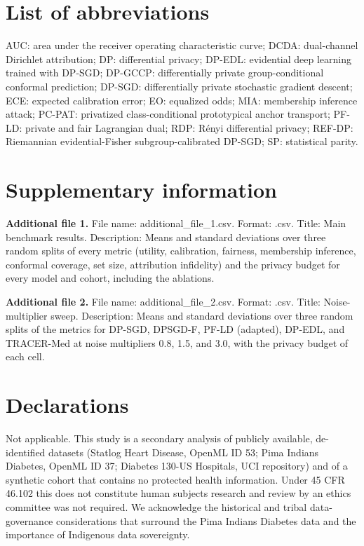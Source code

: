 \documentclass[pdflatex,sn-vancouver-num,referee,lineno]{sn-jnl}
\theoremstyle{thmstyleone}
\theoremstyle{thmstylethree}
\begin{document}
\section*{List of abbreviations}
\noindent AUC: area under the receiver operating characteristic curve; DCDA: dual-channel Dirichlet attribution; DP: differential privacy; DP-EDL: evidential deep learning trained with DP-SGD; DP-GCCP: differentially private group-conditional conformal prediction; DP-SGD: differentially private stochastic gradient descent; ECE: expected calibration error; EO: equalized odds; MIA: membership inference attack; PC-PAT: privatized class-conditional prototypical anchor transport; PF-LD: private and fair Lagrangian dual; RDP: R\'enyi differential privacy; REF-DP: Riemannian evidential-Fisher subgroup-calibrated DP-SGD; SP: statistical parity.


\section*{Supplementary information}
\noindent\textbf{Additional file 1.} File name: additional\_file\_1.csv. Format: .csv. Title: Main benchmark results. Description: Means and standard deviations over three random splits of every metric (utility, calibration, fairness, membership inference, conformal coverage, set size, attribution infidelity) and the privacy budget for every model and cohort, including the ablations.

\noindent\textbf{Additional file 2.} File name: additional\_file\_2.csv. Format: .csv. Title: Noise-multiplier sweep. Description: Means and standard deviations over three random splits of the metrics for DP-SGD, DPSGD-F, PF-LD (adapted), DP-EDL, and TRACER-Med at noise multipliers 0.8, 1.5, and 3.0, with the privacy budget of each cell.

\section*{Declarations}

Not applicable. This study is a secondary analysis of publicly available, de-identified datasets (Statlog Heart Disease, OpenML ID 53; Pima Indians Diabetes, OpenML ID 37; Diabetes 130-US Hospitals, UCI repository) and of a synthetic cohort that contains no protected health information. Under 45 CFR 46.102 this does not constitute human subjects research and review by an ethics committee was not required. We acknowledge the historical and tribal data-governance considerations that surround the Pima Indians Diabetes data and the importance of Indigenous data sovereignty.
\end{document}
